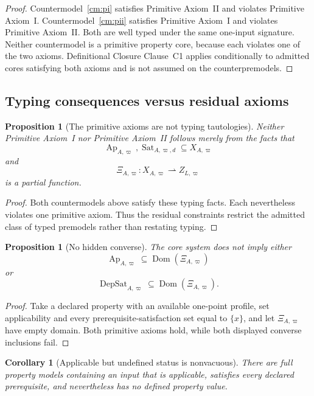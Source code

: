 \documentclass[11pt]{article}
\newcommand{\Ap}{\operatorname{Ap}}
\newcommand{\DepSat}{\operatorname{DepSat}}
\newcommand{\Sat}{\operatorname{Sat}}
\newcommand{\Dom}{\operatorname{Dom}}
\newtheorem{proposition}[theorem]{Proposition}
\newtheorem{corollary}[theorem]{Corollary}
\theoremstyle{definition}
\theoremstyle{remark}
\begin{document}
\begin{proof}
Countermodel~\ref{cm:pi} satisfies Primitive Axiom~II and violates Primitive Axiom~I.
Countermodel~\ref{cm:pii} satisfies Primitive Axiom~I and violates Primitive Axiom~II.
Both are well typed under the same one-input signature.
Neither countermodel is a primitive property core, because each violates one of the two axioms.
Definitional Closure Clause~C1 applies conditionally to admitted cores satisfying both axioms and is not assumed on the counterpremodels.
\end{proof}

\subsection{Typing consequences versus residual axioms}

\begin{proposition}[The primitive axioms are not typing tautologies]
Neither Primitive Axiom~I nor Primitive Axiom~II follows merely from the facts that
\[
\Ap_{A,\varpi},\Sat_{A,\varpi,d}\subseteq X_{A,\varpi}
\]
and
\[
\Xi_{A,\varpi}:X_{A,\varpi}\rightharpoonup Z_{L,\varpi}
\]
is a partial function.
\end{proposition}

\begin{proof}
Both countermodels above satisfy these typing facts.
Each nevertheless violates one primitive axiom.
Thus the residual constraints restrict the admitted class of typed premodels rather than restating typing.
\end{proof}

\begin{proposition}[No hidden converse]
The core system does not imply either
\[
\Ap_{A,\varpi}\subseteq\Dom(\Xi_{A,\varpi})
\]
or
\[
\DepSat_{A,\varpi}\subseteq\Dom(\Xi_{A,\varpi}).
\]
\end{proposition}

\begin{proof}
Take a declared property with an available one-point profile, set applicability and every prerequisite-satisfaction set equal to \(\{x\}\), and let \(\Xi_{A,\varpi}\) have empty domain.
Both primitive axioms hold, while both displayed converse inclusions fail.
\end{proof}

\begin{corollary}[Applicable but undefined status is nonvacuous]
There are full property models containing an input that is applicable, satisfies every declared prerequisite, and nevertheless has no defined property value.
\end{corollary}
\end{document}
